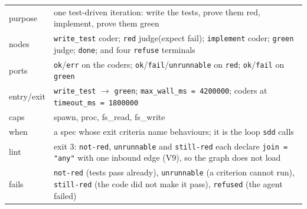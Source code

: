 \begin{center}
\begin{minipage}{\linewidth}
\centering
{}
\end{minipage}
\end{center}

\begin{center}\footnotesize
\begin{tabular}{@{}>{\raggedright\arraybackslash}p{}>{\raggedright\arraybackslash}p{}@{}}
  purpose & one test-driven iteration: write the tests, prove them red, implement, prove them
    green \\
  nodes & \texttt{write\_test} coder; \texttt{red} judge(expect fail); \texttt{implement}
    coder; \texttt{green} judge; \texttt{done}; and four \texttt{refuse} terminals \\
  ports & \texttt{ok}/\texttt{err} on the coders; \texttt{ok}/\texttt{fail}/\texttt{unrunnable}
    on \texttt{red}; \texttt{ok}/\texttt{fail} on \texttt{green} \\
  entry/exit & \texttt{write\_test} $\to$ \texttt{green}; \texttt{max\_wall\_ms = 4200000};
    coders at \texttt{timeout\_ms = 1800000} \\
  caps & spawn, proc, fs\_read, fs\_write \\
  when & a spec whose exit criteria name behaviours; it is the loop \texttt{sdd} calls \\
  lint & exit 3: \texttt{not-red}, \texttt{unrunnable} and \texttt{still-red} each declare
    \texttt{join = "any"} with one inbound edge (V9), so the graph does not load \\
  fails & \texttt{not-red} (tests pass already), \texttt{unrunnable} (a criterion cannot
    run), \texttt{still-red} (the code did not make it pass), \texttt{refused} (the agent
    failed) \\
\end{tabular}
\end{center}


